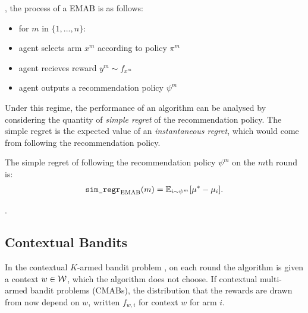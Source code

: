         , the process of a EMAB is as follows:
        \begin{itemize}
            \item for $m$ in $\{1,...,n\}$:
            \item agent selects arm $x^m$ according to policy $\pi^m$
            \item agent recieves reward $y^m \sim f_{x^m}$
            \item agent outputs a recommendation policy $\psi^m$
        \end{itemize}

        Under this regime, the performance of an algorithm can be analysed by considering the quantity of \textit{simple regret} of the recommendation policy. The simple regret is the expected value of an \textit{instantaneous regret},  which would come from following the recommendation policy.

        \begin{defn}
            The \textnormal{simple regret} of following the recommendation policy $\psi^m$ on the $m$th round is:
            \begin{align}
                {\textnormal{\texttt{sim\_regr}}}_{{\textnormal{EMAB}}}(m) = \mathbb{E}_{i\sim\psi^m}[\mu^* - \mu_i].
            \end{align}
        \end{defn}


        .



    
    \subsection{Contextual Bandits}
    \label{sec:2-3-2-contextual-mab}


        In the contextual $K$-armed bandit problem , on each round the algorithm is given a context $w\in \mathcal{W}$, which the algorithm does not choose. If contextual multi-armed bandit problems (CMABs), the distribution that the rewards are drawn from now depend on $w$, written $f_{w,i}$ for context $w$ for arm $i$. 


